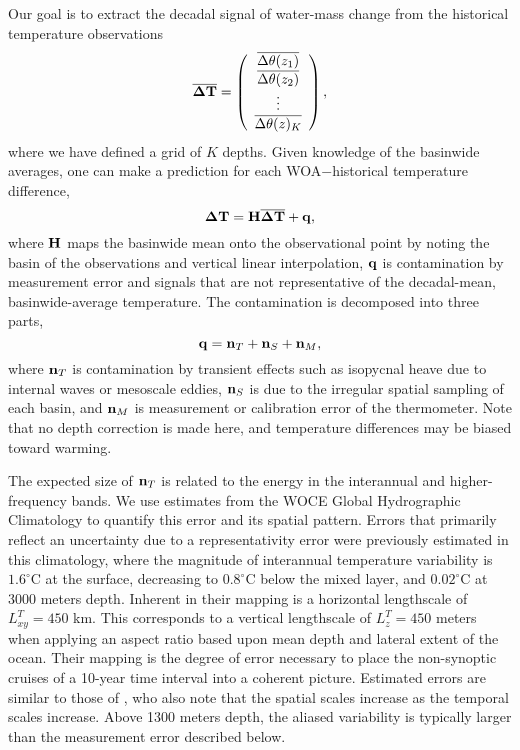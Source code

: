 \documentclass[12pt]{article}
\begin{document}
Our goal is to extract the decadal signal of water-mass change from
the historical temperature observations 
\begin{equation}
\overline{{\boldsymbol \Delta}{\bf T}} = \left(\begin{array}{c} \overline{\Delta \theta(z_1)}
                  \\\overline{\Delta \theta(z_2)} \\ \vdots \\ \overline{\Delta \theta(z)_K} 
 \end{array} \right),
\end{equation}
where we have defined a grid of $K$ depths.  Given knowledge of the
basinwide averages, one can make a prediction for each WOA$-$historical temperature difference,
\begin{equation}
{\boldsymbol \Delta}{\bf T} = {\bf H}\overline{{\boldsymbol \Delta}{\bf T}} + {\bf q},
\end{equation}
where ${\bf H}$ maps the basinwide mean onto the observational point
by noting the basin of the observations and vertical linear
interpolation, ${\bf q}$ is contamination by measurement error and
signals that are not representative of the decadal-mean,
basinwide-average temperature. The contamination is decomposed into
three parts,
\begin{equation}
{\bf q} = {\bf n}_T + {\bf n}_S + {\bf n}_M,
\end{equation}
where ${\bf n}_T$ is contamination by transient effects such as
isopycnal heave due to internal waves or mesoscale eddies, ${\bf n}_S$
is due to the irregular spatial sampling of each basin, and
${\bf n}_M$ is measurement or calibration error of the
thermometer. Note that no depth correction is made here, and
temperature differences may be biased toward warming.

The expected size of ${\bf n}_T$ is related to the energy in the
interannual and higher-frequency bands. We use estimates from the WOCE
Global Hydrographic Climatology \cite{Gouretski-Koltermann-2004:WOCE}
to quantify this error and its spatial pattern.  Errors that primarily
reflect an uncertainty due to a representativity error were previously
estimated in this climatology, where the magnitude of interannual
temperature variability is $1.6^{\circ}$C at the surface, decreasing
to $0.8^{\circ}$C below the mixed layer, and $0.02^{\circ}$C at 3000
meters depth. Inherent in their mapping is a horizontal lengthscale of
$L_{xy}^{T}=450$ km. This corresponds to a vertical lengthscale of
$L_z^{T}=450$ meters when applying an aspect ratio based upon mean
depth and lateral extent of the ocean. Their mapping is the degree of
error necessary to place the non-synoptic cruises of a 10-year time
interval into a coherent picture. Estimated errors are similar to
those of \cite{Wortham-Wunsch-2014:multidimensional}, who also note
that the spatial scales increase as the temporal scales
increase. Above 1300 meters depth, the aliased variability is
typically larger than the measurement error described below.
\end{document}

